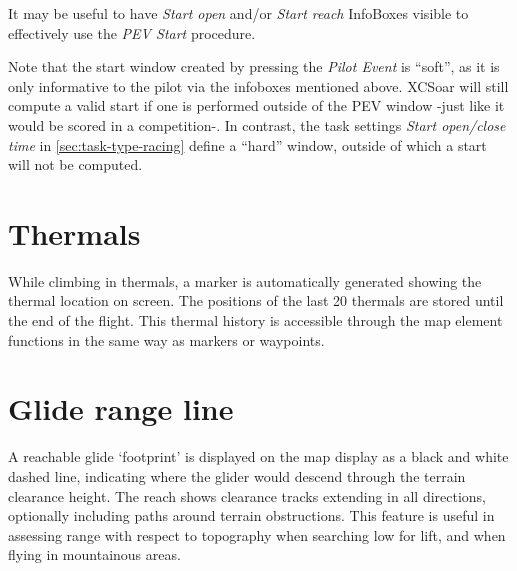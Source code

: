 \tip It may be useful to have \emph{Start open} and/or \emph{Start reach}
 InfoBoxes visible to effectively use the \emph{PEV Start} procedure.

\tip Note that the start window created by pressing the \emph{Pilot Event}
is ``soft'', as it is only informative to the pilot via the infoboxes mentioned above.
XCSoar will still compute a valid start if one is performed outside of 
the PEV window -just like it would be scored in a competition-. In contrast,
the task settings \emph{Start open/close time} in \ref{sec:task-type-racing} define
a ``hard'' window, outside of which a start will not be computed.


\section{Thermals}

While climbing in thermals, a marker is automatically generated showing the
thermal location on screen.    The positions of the last 20 thermals are
stored until the end of the flight.
This thermal history is accessible through the map
element functions in the same way as markers or waypoints.


\section{Glide range line}\label{sec:reach}

A reachable glide `footprint' is displayed on the map display as a
black and white dashed line, indicating where the glider would descend
through the terrain clearance height.  The reach shows clearance
tracks extending in all directions, optionally including paths around
terrain obstructions.  This feature is useful in assessing range with
respect to topography when searching low for lift, and when flying in
mountainous areas.

